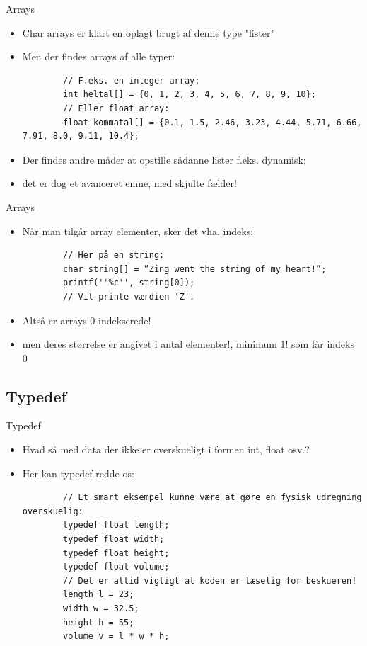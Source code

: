 \documentclass{beamer}
\begin{document}

\begin{frame}[fragile]{Arrays}
	\begin{itemize}
		\item{Char arrays er klart en oplagt brugt af denne type "lister"}
		\item{Men der findes arrays af alle typer:}
		\begin{lstlisting}
		// F.eks. en integer array:
		int heltal[] = {0, 1, 2, 3, 4, 5, 6, 7, 8, 9, 10};
		// Eller float array:
		float kommatal[] = {0.1, 1.5, 2.46, 3.23, 4.44, 5.71, 6.66, 7.91, 8.0, 9.11, 10.4};
		\end{lstlisting}
		\item{Der findes andre måder at opstille sådanne lister f.eks. dynamisk};
		\item{det er dog et avanceret emne, med skjulte fælder!}
		
	\end{itemize}
\end{frame}
		

\begin{frame}[fragile]{Arrays}
	\begin{itemize}
		\item{Når man tilgår array elementer, sker det vha. indeks:}
		\begin{lstlisting}
		// Her på en string:
		char string[] = ”Zing went the string of my heart!”;
		printf(''%c'', string[0]);
		// Vil printe værdien 'Z'. 
		\end{lstlisting}
		\item{Altså er arrays 0-indekserede!}
		\item{men deres størrelse er angivet i antal elementer!, minimum 1! som får indeks 0}
	\end{itemize}
\end{frame}

\subsection{Typedef}

\begin{frame}[fragile]{Typedef}
	\begin{itemize}
		\item{Hvad så med data der ikke er overskueligt i formen int, float osv.?}
		\item{Her kan {\color{C_darkblue}typedef} redde os:}
		\begin{lstlisting}
		// Et smart eksempel kunne være at gøre en fysisk udregning overskuelig:
		typedef float length;
		typedef float width;
		typedef float height;
		typedef float volume;
		// Det er altid vigtigt at koden er læselig for beskueren!
		length l = 23;
		width w = 32.5;
		height h = 55;
		volume v = l * w * h;
		\end{lstlisting}
	\end{itemize}
\end{frame}
\end{document}
